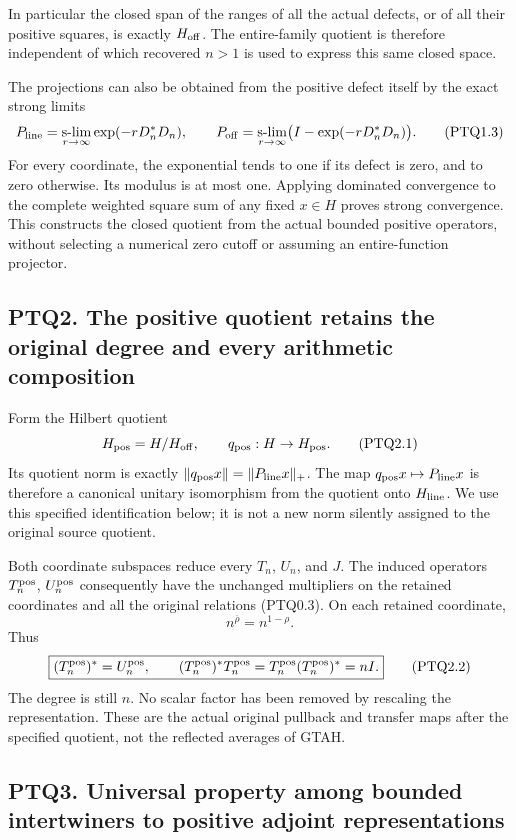 In particular the closed span of the ranges of all the actual defects,
or of all their positive squares, is exactly \(H_{\rm off}\). The
entire-family quotient is therefore independent of which recovered
\(n>1\) is used to express this same closed space.

The projections can also be obtained from the positive defect itself by
the exact strong limits \[
P_{\rm line}=\operatorname*{s-lim}_{r\to\infty}
\exp(-rD_n^*D_n),\qquad
P_{\rm off}=\operatorname*{s-lim}_{r\to\infty}
\bigl(I-\exp(-rD_n^*D_n)\bigr).
\tag{PTQ1.3}
\] For every coordinate, the exponential tends to one if its defect is
zero, and to zero otherwise. Its modulus is at most one. Applying
dominated convergence to the complete weighted square sum of any fixed
\(x\in H\) proves strong convergence. This constructs the closed
quotient from the actual bounded positive operators, without selecting a
numerical zero cutoff or assuming an entire-function projector.

\subsection{PTQ2. The positive quotient retains the original degree and
every arithmetic
composition}\label{ptq2.-the-positive-quotient-retains-the-original-degree-and-every-arithmetic-composition}

Form the Hilbert quotient \[
H_{\rm pos}=H/H_{\rm off},\qquad
q_{\rm pos}:H\to H_{\rm pos}.
\tag{PTQ2.1}
\] Its quotient norm is exactly
\(\|q_{\rm pos}x\|=\|P_{\rm line}x\|_+\). The map
\(q_{\rm pos}x\mapsto P_{\rm line}x\) is therefore a canonical unitary
isomorphism from the quotient onto \(H_{\rm line}\). We use this
specified identification below; it is not a new norm silently assigned
to the original source quotient.

Both coordinate subspaces reduce every \(T_n\), \(U_n\), and \(J\). The
induced operators \(T_n^{\rm pos}\), \(U_n^{\rm pos}\) consequently have
the unchanged multipliers on the retained coordinates and all the
original relations (PTQ0.3). On each retained coordinate, \[
n^{\overline\rho}=n^{1-\rho}.
\] Thus \[
\boxed{(T_n^{\rm pos})^*=U_n^{\rm pos},\qquad
(T_n^{\rm pos})^*T_n^{\rm pos}
=T_n^{\rm pos}(T_n^{\rm pos})^*=nI.}
\tag{PTQ2.2}
\] The degree is still \(n\). No scalar factor has been removed by
rescaling the representation. These are the actual original pullback and
transfer maps after the specified quotient, not the reflected averages
of GTAH.

\subsection{PTQ3. Universal property among bounded intertwiners to
positive adjoint
representations}\label{ptq3.-universal-property-among-bounded-intertwiners-to-positive-adjoint-representations}

